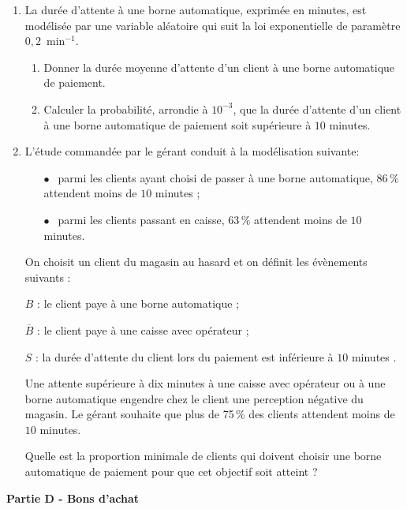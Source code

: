\documentclass[10pt,a4paper]{article}
\begin{document}
\begin{enumerate}
\item La durée d'attente à une borne automatique, exprimée en minutes, est modélisée par une
variable aléatoire qui suit la loi exponentielle de paramètre $0,2$~min$^{-1}$.
	\begin{enumerate}
		\item Donner la durée moyenne d'attente d'un client à une borne automatique de paiement.
		\item Calculer la probabilité, arrondie à $10^{-3}$, que la durée d'attente d'un client à une borne automatique de paiement soit supérieure à $10$ minutes.
	\end{enumerate}
\item L'étude commandée par le gérant conduit à la modélisation suivante:
	
\setlength\parindent{9mm}
\begin{itemize}
\item[$\bullet~~$] parmi les clients ayant choisi de passer à une borne automatique, 86\,\% attendent moins de $10$ minutes ;
\item[$\bullet~~$] parmi les clients passant en caisse, 63\,\% attendent moins de $10$ minutes.
\end{itemize}
\setlength\parindent{0mm}

\medskip

On choisit un client du magasin au hasard et on définit les évènements suivants :

$B$ : \og le client paye à une borne automatique \fg{} ;

$\overline{B}$ : \og le client paye à une caisse avec opérateur \fg{} ;

$S$ : \og la durée d'attente du client lors du paiement est inférieure à $10$ minutes \fg.

Une attente supérieure à dix minutes à une caisse avec opérateur ou à une borne automatique
engendre chez le client une perception négative du magasin. Le gérant souhaite que
plus de 75\,\% des clients attendent moins de $10$ minutes.

Quelle est la proportion minimale de clients qui doivent choisir une borne automatique de
paiement pour que cet objectif soit atteint ?
 \end{enumerate}
 
\bigskip

\textbf{Partie D - Bons d'achat}

\medskip
\end{document}
